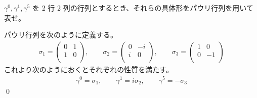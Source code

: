 \documentclass[uplatex,dvipdfmx,a4paper,11pt]{jlreq}
\makeatletter
\numberwithin{equation}{section}
\theoremstyle{definition}
\renewenvironment{proof}[1][\proofname]{\par
  \normalfont
  \topsep6\p@\@plus6\p@ \trivlist
  \item[\hskip\labelsep{\bfseries #1}\@addpunct{\bfseries}]\ignorespaces\quad\par
}{%
  \qed\endtrivlist\@endpefalse
}
\renewcommand\proofname{証明}
\makeatother
\begin{document}
\begin{problem}
$\gamma^0, \gamma^1, \gamma^5$ を 2 行 2 列の行列とするとき、それらの具体形をパウリ行列を用いて表せ。
\end{problem}
\begin{proof}
  パウリ行列を次のように定義する。
  \begin{align}
    \sigma_1 = \begin{pmatrix}
                 0 & 1 \\
                 1 & 0 \\
               \end{pmatrix}, \qquad
    \sigma_2 = \begin{pmatrix}
                 0 & -i \\
                 i & 0  \\
               \end{pmatrix}, \qquad
    \sigma_3 = \begin{pmatrix}
                 1 & 0  \\
                 0 & -1 \\
               \end{pmatrix}
  \end{align}
  これより次のようにおくとそれぞれの性質を満たす。
  \begin{align}
    \gamma^0 = \sigma_1, \qquad \gamma^1 = i\sigma_2, \qquad \gamma^5 = -\sigma_3
  \end{align}
\end{proof}
\end{document}
